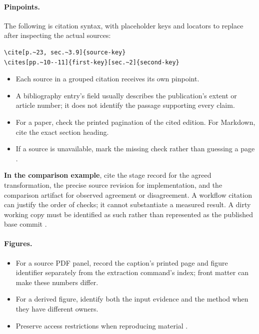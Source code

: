 \paragraph{Pinpoints.} The following is citation syntax, with placeholder keys and locators
to replace after inspecting the actual sources:
\begin{lstlisting}
\cite[p.~23, sec.~3.9]{source-key}
\cites[pp.~10--11]{first-key}[sec.~2]{second-key}
\end{lstlisting}
\begin{itemize}
  \item Each source in a grouped citation receives its own pinpoint.
  \item A bibliography entry's  field usually describes the publication's extent or
        article number; it does not identify the passage supporting every claim.
  \item For a paper, check the printed pagination of the cited edition. For Markdown, cite the
        exact section heading.
  \item If a source is unavailable, mark the missing check rather than guessing a page
        \cite[Bibliography and reader-verifiable pinpoints]{skill:report-production}.
\end{itemize}

\textbf{In the comparison example}, cite the stage record for the agreed
transformation, the precise source revision for implementation, and the comparison
artifact for observed agreement or disagreement. A workflow citation can justify the order
of checks; it cannot substantiate a measured result. A dirty working copy must be
identified as such rather than represented as the published base commit \cite[Source
  traceability and corroboration; Bibliography and reader-verifiable
  pinpoints]{skill:report-production}.

\paragraph{Figures.}
\begin{itemize}
  \item For a source PDF panel, record the caption's printed page and figure identifier
        separately from the extraction command's  index; front matter can make these
        numbers differ.
  \item For a derived figure, identify both the input evidence and the method when they have
        different owners.
  \item Preserve access restrictions when reproducing material \cite[Choose form by information
          structure; Bibliography and reader-verifiable pinpoints]{skill:report-production}.
\end{itemize}

